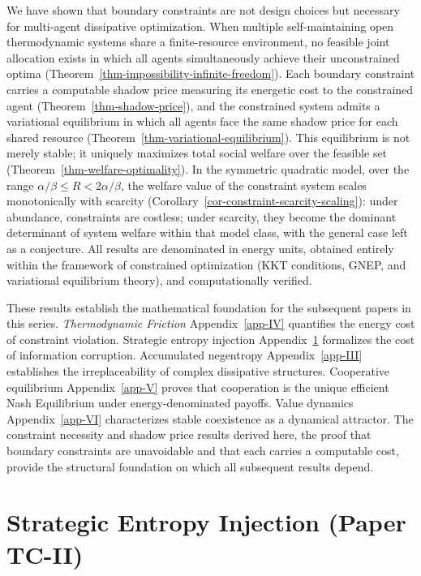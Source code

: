 \documentclass[11pt]{article}
\theoremstyle{plain}
\theoremstyle{definition}
\theoremstyle{remark}
\let\origsection\section
\renewcommand{\section}{\needspace{12\baselineskip}\origsection}
\begin{document}
We have shown that boundary constraints are not design choices but
necessary for multi-agent dissipative optimization. When multiple
self-maintaining open thermodynamic systems share a finite-resource
environment, no feasible joint allocation exists in which all agents
simultaneously achieve their unconstrained optima
(Theorem~\ref{thm-impossibility-infinite-freedom}). Each boundary
constraint carries a computable shadow price measuring its energetic
cost to the constrained agent (Theorem~\ref{thm-shadow-price}), and the
constrained system admits a variational equilibrium in which all agents
face the same shadow price for each shared resource
(Theorem~\ref{thm-variational-equilibrium}). This equilibrium is not
merely stable; it uniquely maximizes total social welfare over the
feasible set (Theorem~\ref{thm-welfare-optimality}). In the symmetric
quadratic model, over the range \(\alpha/\beta \leq R < 2\alpha/\beta\),
the welfare value of the constraint system scales monotonically with
scarcity (Corollary~\ref{cor-constraint-scarcity-scaling}): under
abundance, constraints are costless; under scarcity, they become the
dominant determinant of system welfare within that model class, with the
general case left as a conjecture. All results are denominated in energy
units, obtained entirely within the framework of constrained
optimization (KKT conditions, GNEP, and variational equilibrium theory),
and computationally verified.

These results establish the mathematical foundation for the subsequent
papers in this series. \emph{Thermodynamic Friction}
Appendix~\ref{app-IV} quantifies the energy cost of constraint
violation. Strategic entropy injection Appendix~\ref{app-II} formalizes
the cost of information corruption. Accumulated negentropy
Appendix~\ref{app-III} establishes the irreplaceability of complex
dissipative structures. Cooperative equilibrium Appendix~\ref{app-V}
proves that cooperation is the unique efficient Nash Equilibrium under
energy-denominated payoffs. Value dynamics Appendix~\ref{app-VI}
characterizes stable coexistence as a dynamical attractor. The
constraint necessity and shadow price results derived here, the proof
that boundary constraints are unavoidable and that each carries a
computable cost, provide the structural foundation on which all
subsequent results depend.

\section{Strategic Entropy Injection (Paper TC-II)}\label{app-II}
\end{document}
